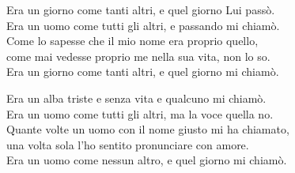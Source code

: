 
\strofa Era un giorno come tanti altri, e quel giorno Lui passò.\\
Era un uomo come tutti gli altri, e passando mi chiamò.\\
Come lo sapesse che il mio nome era proprio quello,\\
come mai vedesse proprio me nella sua vita, non lo so.\\
Era un giorno come tanti altri, e quel giorno mi chiamò.

\spazio


\spazio

\strofa Era un alba triste e senza vita e qualcuno mi chiamò.\\
Era un uomo come tutti gli altri, ma la voce quella no.\\
Quante volte un uomo con il nome giusto mi ha chiamato,\\
una volta sola l'ho sentito pronunciare con amore.\\
Era un uomo come nessun altro, e quel giorno mi chiamò.

\spazio

